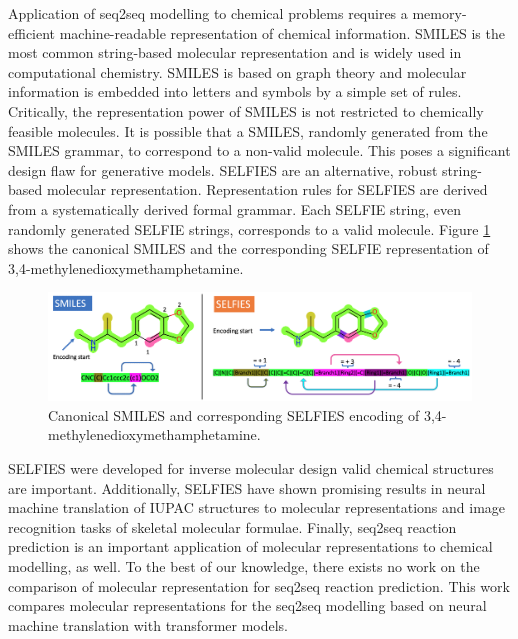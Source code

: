 \documentclass[10pt,conference,compsocconf]{IEEEtran}
\begin{document}
Application of seq2seq modelling to chemical problems requires a memory-efficient machine-readable representation of chemical information. SMILES is the most common string-based molecular representation and is widely used in computational chemistry.\cite{MolecularTransformer} SMILES is based on graph theory and molecular information is embedded into letters and symbols by a simple set of rules\cite{Weininger1988SMILESAC,Weininger1989SMILES2A}. Critically, the representation power of SMILES is not restricted to chemically feasible molecules.\cite{SELFIES} It is possible that a SMILES, randomly generated from the SMILES grammar, to correspond to a non-valid molecule. This poses a significant design flaw for generative models. SELFIES are an alternative, robust string-based molecular representation.\cite{SELFIES} Representation rules for SELFIES are derived from a systematically derived formal grammar. Each SELFIE string, even randomly generated SELFIE strings, corresponds to a valid molecule. Figure \ref{fig:encoding} shows the canonical SMILES and the corresponding SELFIE representation of 3,4-methylenedioxymethamphetamine. \\

\begin{figure}
    \centering
    \includegraphics[width = .9\textwidth]{figures/SELFIES_SMILES_explanation.png}
    \caption{Canonical SMILES and corresponding SELFIES encoding of 3,4-methylenedioxymethamphetamine.}
    \label{fig:encoding}
\end{figure} 

SELFIES were developed for inverse molecular design valid chemical structures are important\cite{SELFIES,SelfiesBlog}. Additionally, SELFIES have shown promising results in neural machine translation of IUPAC structures to molecular representations\cite{Selfies4NMT} and image recognition tasks of skeletal molecular formulae\cite{Selfies4ImageRecognition}. Finally, seq2seq reaction prediction is an important application of molecular representations to chemical modelling, as well. To the best of our knowledge, there exists no work on the comparison of molecular representation for seq2seq reaction prediction. This work compares molecular representations for the seq2seq modelling based on neural machine translation with transformer models.
\end{document}
